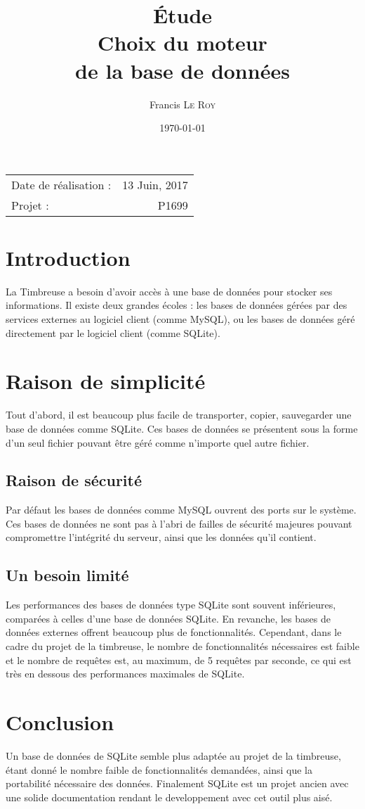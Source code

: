 \documentclass[10pt,a4paper,onecolumn]{article}
\title{Étude \\ Choix du moteur \\ de la base de données}
\author{Francis \textsc{Le Roy}}
\date{\today}
\begin{document}
\maketitle
\thispagestyle{fancy}

\begin{center}
\begin{tabular}{l r}
Date de réalisation : & 13 Juin, 2017 \\
Projet : & P1699 \\
\end{tabular}
\end{center}


\section{Introduction}
La Timbreuse a besoin d'avoir accès à une base de données pour stocker ses informations. Il existe deux grandes écoles : les bases de données gérées par des services externes au logiciel client (comme MySQL), ou les bases de données géré directement par le logiciel client (comme SQLite).
\section{Raison de simplicité}
Tout d'abord, il est beaucoup plus facile de transporter, copier, sauvegarder une base de données comme SQLite. Ces bases de données se présentent sous la forme d'un seul fichier pouvant être géré comme n'importe quel autre fichier. 
\subsection{Raison de sécurité}
Par défaut les bases de données comme MySQL ouvrent des ports sur le système. Ces bases de données ne sont pas à l'abri de failles de sécurité majeures pouvant compromettre l'intégrité du serveur, ainsi que les données qu'il contient.
\subsection{Un besoin limité}
Les performances des bases de données type SQLite sont souvent inférieures, comparées à celles d'une base de données SQLite. En revanche, les bases de données externes offrent beaucoup plus de fonctionnalités. Cependant, dans le cadre du projet de la timbreuse, le nombre de fonctionnalités nécessaires est faible et le nombre de requêtes est, au maximum, de 5 requêtes par seconde, ce qui est très en dessous des performances maximales de SQLite.

\section{Conclusion}
Un base de données de SQLite semble plus adaptée au projet de la timbreuse, étant donné le nombre faible de fonctionnalités demandées, ainsi que la portabilité nécessaire des données. Finalement SQLite est un projet ancien avec une solide documentation rendant le developpement avec cet outil plus aisé.

\printbibliography
\end{document}
